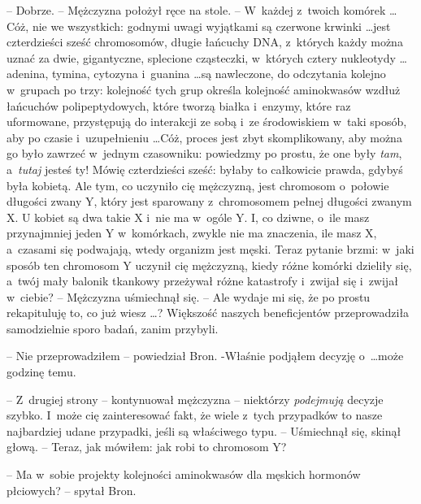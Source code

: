 \documentclass[oneside,polish,11pt,rmheadings]{mwbk}
\begin{document}
-- Dobrze. --  Mężczyzna położył ręce na stole. -- W~każdej z~twoich komórek \ldots  Cóż, nie we wszystkich: godnymi uwagi wyjątkami są czerwone krwinki \ldots  jest czterdzieści sześć chromosomów, długie łańcuchy DNA, z~których każdy można uznać za dwie, gigantyczne, splecione cząsteczki, w~których cztery nukleotydy \ldots  adenina, tymina, cytozyna i~guanina \ldots  są nawleczone, do odczytania kolejno w~grupach po trzy: kolejność tych grup określa kolejność aminokwasów wzdłuż łańcuchów polipeptydowych, które tworzą białka i~enzymy, które raz uformowane, przystępują do interakcji ze sobą i~ze środowiskiem w~taki sposób, aby po czasie i~uzupełnieniu  \ldots  Cóż, proces jest zbyt skomplikowany, aby można go było zawrzeć w~jednym czasowniku: powiedzmy po prostu, że one były \textit{tam}, a~\textit{tutaj }jesteś ty! Mówię czterdzieści sześć: byłaby to całkowicie prawda, gdybyś była kobietą. Ale tym, co uczyniło cię mężczyzną, jest chromosom o~połowie długości zwany Y, który jest sparowany z~chromosomem pełnej długości zwanym X. U kobiet są dwa takie X i~nie ma w~ogóle Y. I, co dziwne, o~ile masz przynajmniej jeden Y w~komórkach, zwykle nie ma znaczenia, ile masz X, a~czasami się podwajają, wtedy organizm jest męski. Teraz pytanie brzmi: w~jaki sposób ten chromosom Y uczynił cię mężczyzną, kiedy różne komórki dzieliły się, a~twój mały balonik tkankowy przeżywał różne katastrofy i~zwijał się i~zwijał w~ciebie?  -- Mężczyzna uśmiechnął się. -- Ale wydaje mi się, że po prostu rekapituluję to, co już wiesz \ldots ? Większość naszych beneficjentów przeprowadziła samodzielnie sporo badań, zanim przybyli. 

-- Nie przeprowadziłem -- powiedział Bron. -Właśnie podjąłem decyzję o~\ldots  może godzinę temu. 

-- Z~drugiej strony -- kontynuował mężczyzna -- niektórzy \textit{podejmują }decyzje szybko. I~może cię zainteresować fakt, że wiele z~tych przypadków to nasze najbardziej udane przypadki, jeśli są właściwego typu. -- Uśmiechnął się, skinął głową. -- Teraz, jak mówiłem: jak robi to chromosom Y?  

-- Ma w~sobie projekty kolejności aminokwasów dla męskich hormonów płciowych?  -- spytał Bron. 
\end{document}
